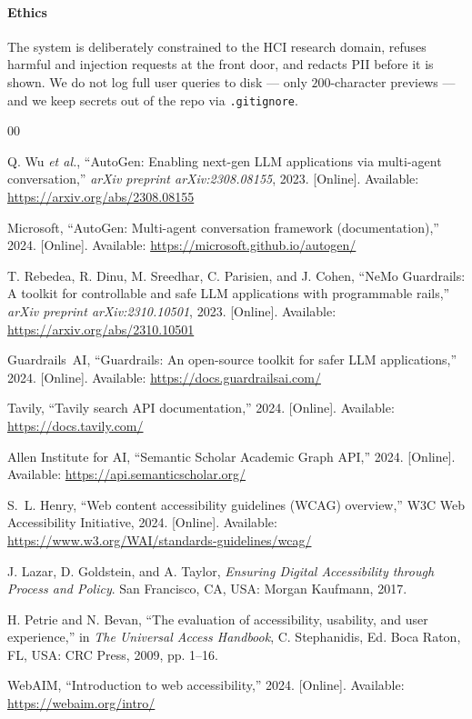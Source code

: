 \documentclass[conference]{IEEEtran}
\begin{document}
\paragraph*{Ethics}
The system is deliberately constrained to the HCI research domain, refuses
harmful and injection requests at the front door, and redacts PII before it
is shown. We do not log full user queries to disk --- only $200$-character
previews --- and we keep secrets out of the repo via \texttt{.gitignore}.

\begin{thebibliography}{00}

Q. Wu \emph{et al.}, ``AutoGen: Enabling next-gen LLM applications via
multi-agent conversation,'' \emph{arXiv preprint arXiv:2308.08155}, 2023.
[Online]. Available: \url{https://arxiv.org/abs/2308.08155}

Microsoft, ``AutoGen: Multi-agent conversation framework (documentation),''
2024. [Online]. Available: \url{https://microsoft.github.io/autogen/}

T. Rebedea, R. Dinu, M. Sreedhar, C. Parisien, and J. Cohen, ``NeMo
Guardrails: A toolkit for controllable and safe LLM applications with
programmable rails,'' \emph{arXiv preprint arXiv:2310.10501}, 2023.
[Online]. Available: \url{https://arxiv.org/abs/2310.10501}

Guardrails~AI, ``Guardrails: An open-source toolkit for safer LLM
applications,'' 2024. [Online]. Available:
\url{https://docs.guardrailsai.com/}

Tavily, ``Tavily search API documentation,'' 2024. [Online]. Available:
\url{https://docs.tavily.com/}

Allen Institute for AI, ``Semantic Scholar Academic Graph API,'' 2024.
[Online]. Available: \url{https://api.semanticscholar.org/}

S.~L. Henry, ``Web content accessibility guidelines (WCAG) overview,''
W3C Web Accessibility Initiative, 2024. [Online]. Available:
\url{https://www.w3.org/WAI/standards-guidelines/wcag/}

J. Lazar, D. Goldstein, and A. Taylor, \emph{Ensuring Digital Accessibility
through Process and Policy}. San Francisco, CA, USA: Morgan Kaufmann, 2017.

H. Petrie and N. Bevan, ``The evaluation of accessibility, usability, and
user experience,'' in \emph{The Universal Access Handbook},
C. Stephanidis, Ed. Boca Raton, FL, USA: CRC Press, 2009, pp. 1--16.

WebAIM, ``Introduction to web accessibility,'' 2024. [Online]. Available:
\url{https://webaim.org/intro/}

\end{thebibliography}
\end{document}
